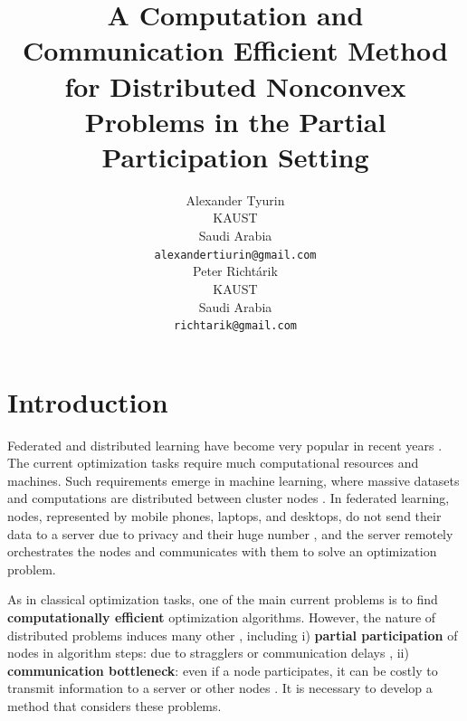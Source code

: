 \documentclass{article}
\title{A Computation and Communication Efficient Method for Distributed Nonconvex Problems in the Partial Participation Setting}
\author{%
  Alexander Tyurin\\
  KAUST\\
  Saudi Arabia\\
  \texttt{alexandertiurin@gmail.com} \\
  \And
  Peter Richt\'{a}rik \\
  KAUST\\
  Saudi Arabia\\
  \texttt{richtarik@gmail.com} \\
}
\begin{document}
\maketitle

\begin{abstract}
\end{abstract}

\section{Introduction}
Federated and distributed learning have become very popular in recent years \citep{konevcny2016federated, mcmahan2017communication}. 
The current optimization tasks require much computational resources and machines. Such requirements emerge in machine learning, where massive datasets and computations are distributed between cluster nodes \citep{lin2017deep, ramesh2021zero}. In federated learning, nodes, represented by mobile phones, laptops, and desktops, do not send their data to a server due to privacy and their huge number \citep{ramaswamy2019federated}, and the server remotely orchestrates the nodes and communicates with them to solve an optimization problem.

As in classical optimization tasks, one of the main current problems is to find \textbf{computationally efficient} optimization algorithms. However, the nature of distributed problems induces many other \citep{kairouz2021advances}, including i) \textbf{partial participation} of nodes in algorithm steps: due to stragglers \citep{li2020federated} or communication delays \citep{vogels2021relaysum}, ii) \textbf{communication bottleneck}: even if a node participates, it can be costly to transmit information to a server or other nodes \citep{alistarh2017qsgd, ramesh2021zero,kairouz2021advances, sapio2019scaling, narayanan2019pipedream}. It is necessary to develop a method that considers these problems.

\end{document}
